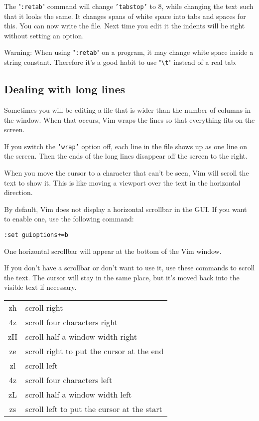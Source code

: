 The "\texttt{:retab}" command will change \texttt{'tabstop'} to 8, while changing the text such that it looks the same.
It changes spans of white space into tabs and spaces for this.
You can now write the file.
Next time you edit it the indents will be right without setting an option.

Warning: When using "\texttt{:retab}" on a program, it may change white space inside a string constant.
Therefore it's a good habit to use "\texttt{\textbackslash{}t}" instead of a real tab.
\subsection{Dealing with long lines}
Sometimes you will be editing a file that is wider than the number of columns in the window.
When that occurs, Vim wraps the lines so that everything fits on the screen.

If you switch the \texttt{'wrap'} option off, each line in the file shows up as one line on the screen.
Then the ends of the long lines disappear off the screen to the right.

When you move the cursor to a character that can't be seen, Vim will scroll the text to show it.
This is like moving a viewport over the text in the horizontal direction.

By default, Vim does not display a horizontal scrollbar in the GUI.
If you want to enable one, use the following command:

\begin{Verbatim}[samepage=true]
 :set guioptions+=b
\end{Verbatim}

One horizontal scrollbar will appear at the bottom of the Vim window.

If you don't have a scrollbar or don't want to use it, use these commands to scroll the text.
The cursor will stay in the same place, but it's moved back into the visible text if necessary.

\begin{center} \begin{tabular}{c l}
				zh & scroll right \\
				4z & scroll four characters right \\
				zH & scroll half a window width right \\
				ze & scroll right to put the cursor at the end \\
				zl & scroll left \\
				4z & scroll four characters left \\
				zL & scroll half a window width left \\
				zs & scroll left to put the cursor at the start \\
\end{tabular} \end{center}

